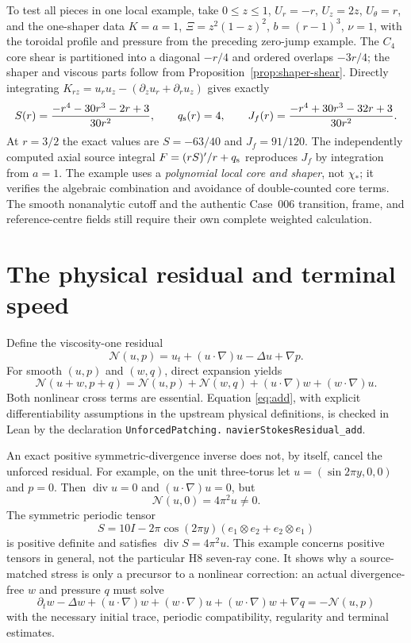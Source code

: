 \documentclass[11pt,a4paper]{article}
\theoremstyle{plain}
\theoremstyle{definition}
\newcommand{\diver}{\operatorname{div}}
\begin{document}
To test all pieces in one local example, take $0\le z\le1$,
$U_r=-r$, $U_z=2z$, $U_\theta=r$, and the one-shaper data
$K=a=1$, $\Xi=z^2(1-z)^2$, $b=(r-1)^3$, $\nu=1$, with the
toroidal profile and pressure from the preceding zero-jump example.
The $C_4$ core shear is partitioned into a diagonal $-r/4$ and
ordered overlaps $-3r/4$; the shaper and viscous parts follow from
Proposition~\ref{prop:shaper-shear}. Directly integrating
$K_{rz}=u_ru_z-(\partial_zu_r+\partial_ru_z)$ gives exactly
\begin{equation}\label{eq:c4-combined-example}
 S(r)=\frac{-r^4-30r^3-2r+3}{30r^2},\qquad
 q_{\rm s}(r)=4,\qquad
 J_f(r)=\frac{-r^4+30r^3-32r+3}{30r^2}.
\end{equation}
At $r=3/2$ the exact values are $S=-63/40$ and $J_f=91/120$.
The independently computed axial source integral
$F=(rS)'/r+q_{\rm s}$ reproduces $J_f$ by integration from $a=1$.
The example uses a \emph{polynomial local core and shaper}, not
$\chi_*$; it verifies the algebraic combination and avoidance of
double-counted core terms. The smooth nonanalytic cutoff and the
authentic Case~006 transition, frame, and reference-centre fields
still require their own complete weighted calculation.

\section{The physical residual and terminal speed}

Define the viscosity-one residual
\begin{equation}\label{eq:residual}
 \mathcal N(u,p)=u_t+(u\cdot\nabla)u-\Delta u+\nabla p.
\end{equation}
For smooth $(u,p)$ and $(w,q)$, direct expansion yields
\begin{equation}\label{eq:add}
 \mathcal N(u+w,p+q)=\mathcal N(u,p)+\mathcal N(w,q)
   +(u\cdot\nabla)w+(w\cdot\nabla)u.
\end{equation}
Both nonlinear cross terms are essential. Equation \eqref{eq:add},
with explicit differentiability assumptions in the upstream physical
definitions, is checked in Lean by the declaration
\texttt{UnforcedPatching.}\allowbreak
\texttt{navierStokesResidual\_add}.

An exact positive symmetric-divergence inverse does not, by itself,
cancel the unforced residual. For example, on the unit three-torus
let $u=(\sin2\pi y,0,0)$ and $p=0$. Then $\diver u=0$ and
$(u\cdot\nabla)u=0$, but
\[
 \mathcal N(u,0)=4\pi^2u\ne0.
\]
The symmetric periodic tensor
\[
 S=10I-2\pi\cos(2\pi y)
 (e_1\otimes e_2+e_2\otimes e_1)
\]
is positive definite and satisfies $\diver S=4\pi^2u$.
This example concerns positive tensors in general, not the
particular H8 seven-ray cone. It shows why a source-matched
stress is only a precursor to a nonlinear correction: an actual
divergence-free $w$ and pressure $q$ must solve
\[
 \partial_tw-\Delta w+(u\cdot\nabla)w+(w\cdot\nabla)u
 +(w\cdot\nabla)w+\nabla q=-\mathcal N(u,p)
\]
with the necessary initial trace, periodic compatibility,
regularity and terminal estimates.
\end{document}
